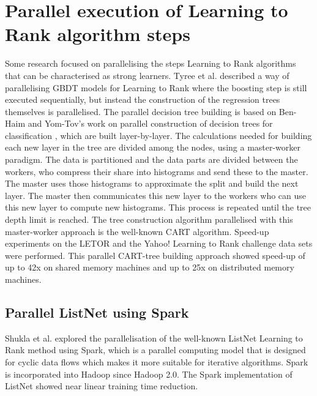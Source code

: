 \section{Parallel execution of Learning to Rank algorithm steps}
Some research focused on parallelising the steps Learning to Rank algorithms that can be characterised as strong learners. Tyree et al. \cite{Tyree2011} described a way of parallelising \ac{GBDT} models for Learning to Rank where the boosting step is still executed sequentially, but instead the construction of the regression trees themselves is parallelised. The parallel decision tree building is based on Ben-Haim and Yom-Tov's work on parallel construction of decision trees for classification \cite{Ben-Haim2010}, which are built layer-by-layer. The calculations needed for building each new layer in the tree are divided among the nodes, using a master-worker paradigm. The data is partitioned and the data parts are divided between the workers, who compress their share into histograms and send these to the master. The master uses those histograms to approximate the split and build the next layer. The master then communicates this new layer to the workers who can use this new layer to compute new histograms. This process is repeated until the tree depth limit is reached. The tree construction algorithm parallelised with this master-worker approach is the well-known \ac{CART} \cite{Breiman1984} algorithm. Speed-up experiments on the LETOR and the Yahoo! Learning to Rank challenge data sets were performed. This parallel \ac{CART}-tree building approach showed speed-up of up to 42x on shared memory machines and up to 25x on distributed memory machines.\\

\subsection{Parallel ListNet using Spark}
Shukla et al. \cite{Shukla2012} explored the parallelisation of the well-known ListNet Learning to Rank method using Spark, which is a parallel computing model that is designed for cyclic data flows which makes it more suitable for iterative algorithms. Spark is incorporated into Hadoop since Hadoop 2.0. The Spark implementation of ListNet showed near linear training time reduction.\\


